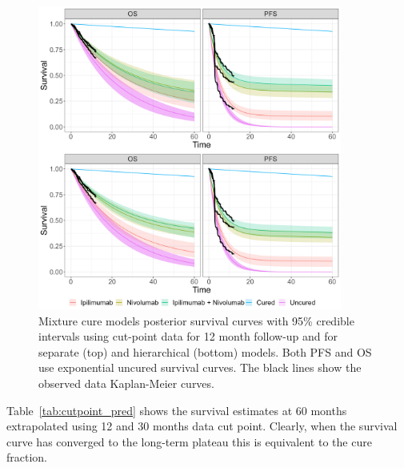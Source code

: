 \documentclass[AMA,STIX1COL]{WileyNJD-v2}
\begin{document}
\begin{figure}[!ht]
\centering
\includegraphics[height=10cm, width=0.6\linewidth]{plot_S_grid_cf_exponential_cpt_12.png}
\caption{\label{fig:S_cutpoint_12mo_exp} Mixture cure models posterior survival curves with 95\% credible intervals using cut-point data for 12 month follow-up and for separate (top) and hierarchical (bottom) models. Both PFS and OS use exponential uncured survival curves. The black lines show the observed data Kaplan-Meier curves.}
\end{figure}



Table~\ref{tab:cutpoint_pred} shows the survival estimates at 60 months extrapolated using 12 and 30 months data cut point. Clearly, when the survival curve has converged to the long-term plateau this is equivalent to the cure fraction.
\end{document}

